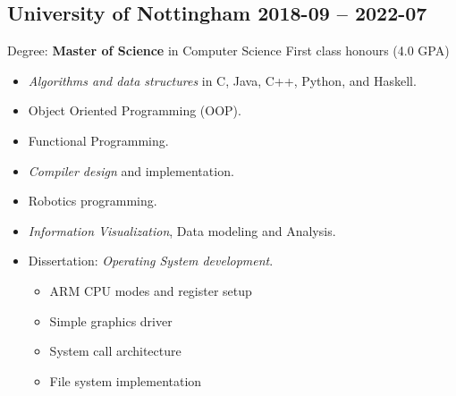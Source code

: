 \subsection{University of Nottingham \hfill 2018-09 -- 2022-07}
Degree: \textbf{Master of Science} in Computer Science
        \hfill
        First class honours (4.0 GPA)
        \begin{itemize}
            \item \emph{Algorithms and data structures} in C, Java, C++,
                Python, and Haskell.
            \item Object Oriented Programming (OOP).
            \item Functional Programming.
            \item \emph{Compiler design} and implementation.
            \item Robotics programming.
            \item \emph{Information Visualization}, Data modeling and Analysis.
            \item Dissertation: \emph{Operating System development}.
                \begin{itemize}
                    \item ARM CPU modes and register setup
                    \item Simple graphics driver
                    \item System call architecture
                    \item File system implementation
                \end{itemize}
        \end{itemize}

